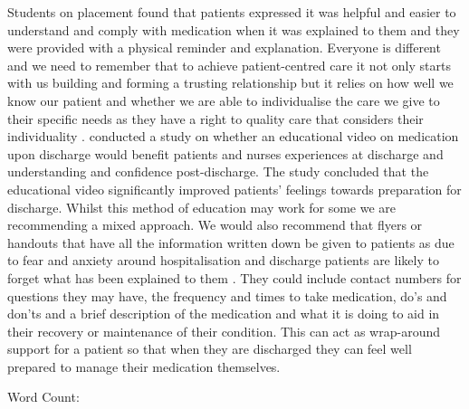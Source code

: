 \documentclass[british,12pt,a4paper]{article}
\begin{document}
	Students on placement found that patients expressed it was helpful and easier to understand and comply with medication when it was explained to them and they were provided with a physical reminder and explanation. Everyone is different and we need to remember that to achieve patient-centred care it not only starts with us building and forming a trusting relationship but it relies on how well we know our patient and whether we are able to individualise the care we give to their specific needs as they have a right to quality care that considers their individuality \parencite{NZNC2012}. \textcite{Sanjai2019} conducted a study on whether an educational video on medication upon discharge would benefit patients and nurses experiences at discharge and understanding and confidence post-discharge. The study concluded that the educational video significantly improved patients' feelings towards preparation for discharge. Whilst this method of education may work for some we are recommending a mixed approach. We would also recommend that flyers or handouts that have all the information written down be given to patients as due to fear and anxiety around hospitalisation and discharge patients are likely to forget what has been explained to them \parencite{Roeung2024}. They could include contact numbers for questions they may have, the frequency and times to take medication, do's and don'ts and a brief description of the medication and what it is doing to aid in their recovery or maintenance of their condition. This can act as wrap-around support for a patient so that when they are discharged they can feel well prepared to manage their medication themselves.

	\vfill
	\begin{center}
		\large Word Count: 
	\end{center}
	\pagebreak
	\doublespacing
	\printbibliography
	
\end{document}
